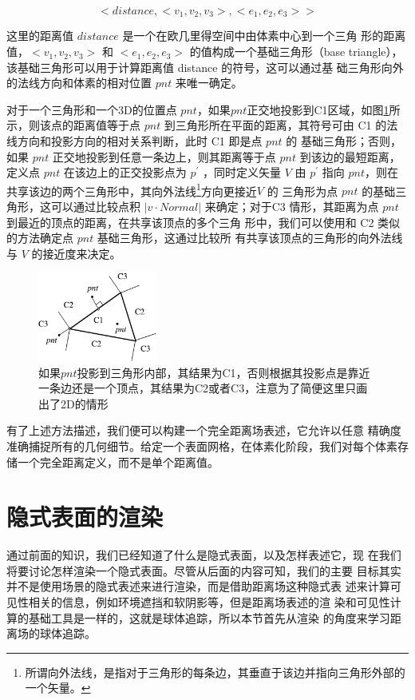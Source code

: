\begin{equation}
	<distance,<v_1,v_2,v_3>,<e_1,e_2,e_3>>
\end{equation}

这里的距离值 $distance$ 是一个在欧几里得空间中由体素中心到一个三角 形的距离值，$< v_1,v_2,v_3 >$ 和 $< e_1,e_2,e_3 >$ 的值构成一个基础三角形（base triangle），该基础三角形可以用于计算距离值 distance 的符号，这可以通过基 础三角形向外的法线方向和体素的相对位置 $pnt$ 来唯一确定。

对于一个三角形和一个3D的位置点 $pnt$，如果$pnt$正交地投影到C1区域，如图\ref{f:df-complete-distance-definition}所示，则该点的距离值等于点 $pnt$ 到三角形所在平面的距离，其符号可由 C1 的法线方向和投影方向的相对关系判断，此时 C1 即是点 $pnt$ 的 基础三角形；否则，如果 $pnt$ 正交地投影到任意一条边上，则其距离等于点 $pnt$ 到该边的最短距离，定义点 $pnt$ 在该边上的正交投影点为 $p^{'}$ ，同时定义矢量 $V$ 由 $p^{'}$ 指向 $pnt$，则在共享该边的两个三角形中，其向外法线\footnote{所谓向外法线，是指对于三角形的每条边，其垂直于该边并指向三角形外部的一个矢量。}方向更接近$ V$ 的 三角形为点 $pnt$ 的基础三角形，这可以通过比较点积 $|v \cdot Normal|$ 来确定；对于C3 情形，其距离为点 $pnt$ 到最近的顶点的距离，在共享该顶点的多个三角 形中，我们可以使用和 C2 类似的方法确定点 $pnt$ 基础三角形，这通过比较所 有共享该顶点的三角形的向外法线与 $V$ 的接近度来决定。

\begin{figure}
	\sidecaption
	\includegraphics[width=0.35\textwidth]{figures/df/complete-distance-definition}
	\caption{如果$pnt$投影到三角形内部，其结果为C1，否则根据其投影点是靠近一条边还是一个顶点，其结果为C2或者C3，注意为了简便这里只画出了2D的情形}
	\label{f:df-complete-distance-definition}
\end{figure}

有了上述方法描述，我们便可以构建一个完全距离场表述，它允许以任意 精确度准确捕捉所有的几何细节。给定一个表面网格，在体素化阶段，我们对每个体素存储一个完全距离定义，而不是单个距离值。




\section{隐式表面的渲染}\label{sec:df-rendering-of-implicit}
通过前面的知识，我们已经知道了什么是隐式表面，以及怎样表述它，现 在我们将要讨论怎样渲染一个隐式表面。尽管从后面的内容可知，我们的主要 目标其实并不是使用场景的隐式表述来进行渲染，而是借助距离场这种隐式表 述来计算可见性相关的信息，例如环境遮挡和软阴影等，但是距离场表述的渲 染和可见性计算的基础工具是一样的，这就是球体追踪，所以本节首先从渲染 的角度来学习距离场的球体追踪。

